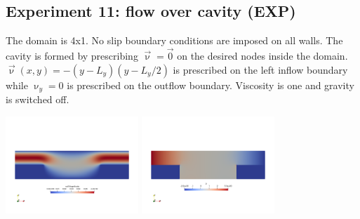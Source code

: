 \newpage
\subsection*{Experiment 11: flow over cavity (EXP)}

The domain is 4x1. No slip boundary conditions are imposed on all walls.
The cavity is formed by prescribing $\vec{\upnu}=\vec{0}$ on the desired 
nodes inside the domain. $\vec{\upnu}(x,y)=-(y-L_y)(y-L_y/2)$ is prescribed 
on the left inflow boundary while $\upnu_y=0$ is prescribed on the outflow boundary.
Viscosity is one and gravity is switched off.
 
\begin{center}
\includegraphics[width=5cm]{python_codes/fieldstone_78/results/exp11/vel}
\includegraphics[width=5cm]{python_codes/fieldstone_78/results/exp11/p}
\end{center}

